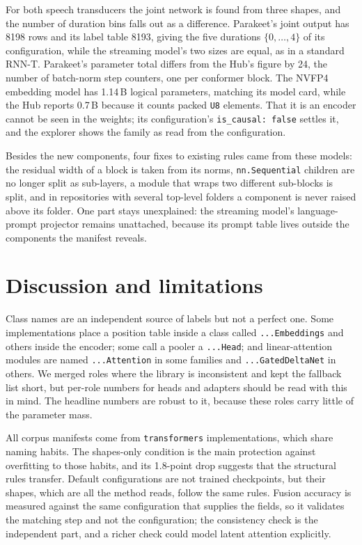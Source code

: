 \documentclass[11pt]{article}
\newcommand{\tn}[1]{\texttt{#1}}
\begin{document}
For both speech transducers the joint network is found from three shapes, and the number of duration bins falls out as a difference. Parakeet's joint output has 8198 rows and its label table 8193, giving the five durations $\{0,\dots,4\}$ of its configuration, while the streaming model's two sizes are equal, as in a standard RNN-T. Parakeet's parameter total differs from the Hub's figure by 24, the number of batch-norm step counters, one per conformer block. The NVFP4 embedding model has 1.14\,B logical parameters, matching its model card, while the Hub reports 0.7\,B because it counts packed \tn{U8} elements. That it is an encoder cannot be seen in the weights; its configuration's \tn{is\_causal: false} settles it, and the explorer shows the family as read from the configuration.

Besides the new components, four fixes to existing rules came from these models: the residual width of a block is taken from its norms, \tn{nn.Sequential} children are no longer split as sub-layers, a module that wraps two different sub-blocks is split, and in repositories with several top-level folders a component is never raised above its folder. One part stays unexplained: the streaming model's language-prompt projector remains unattached, because its prompt table lives outside the components the manifest reveals.

\section{Discussion and limitations}
\label{sec:limits}

Class names are an independent source of labels but not a perfect one. Some implementations place a position table inside a class called \tn{...Embeddings} and others inside the encoder; some call a pooler a \tn{...Head}; and linear-attention modules are named \tn{...Attention} in some families and \tn{...GatedDeltaNet} in others. We merged roles where the library is inconsistent and kept the fallback list short, but per-role numbers for heads and adapters should be read with this in mind. The headline numbers are robust to it, because these roles carry little of the parameter mass.

All corpus manifests come from \tn{transformers} implementations, which share naming habits. The shapes-only condition is the main protection against overfitting to those habits, and its 1.8-point drop suggests that the structural rules transfer. Default configurations are not trained checkpoints, but their shapes, which are all the method reads, follow the same rules. \RBlimits{} Fusion accuracy is measured against the same configuration that supplies the fields, so it validates the matching step and not the configuration; the consistency check is the independent part, and a richer check could model latent attention explicitly.
\end{document}
